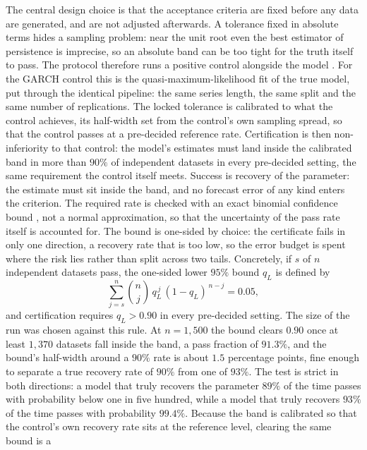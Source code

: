\documentclass[12pt,a4paper]{article}
\begin{document}
The central design choice is that the acceptance criteria are fixed
before any data are generated, and are not adjusted afterwards. A tolerance fixed in absolute terms hides a
sampling problem: near the unit root even the best estimator of
persistence is imprecise, so an absolute band can be too tight for the
truth itself to pass. The protocol therefore runs a positive control
alongside the model \citep{boger2026}. For the GARCH control this is
the quasi-maximum-likelihood fit of the true model, put through the
identical pipeline: the same series length, the same split and the same
number of replications. The locked tolerance is calibrated to what the
control achieves, its half-width set from the control's own sampling
spread, so that the control passes at a pre-decided reference rate.
Certification is then non-inferiority to that control: the model's
estimates must land inside the calibrated band in more than $90\%$ of
independent datasets in every pre-decided setting, the same requirement
the control itself meets. Success is recovery of the parameter: the
estimate must sit inside the band, and no forecast error of any kind
enters the criterion. The required rate is checked with an exact binomial
confidence bound \citep{clopperpearson1934}, not a normal approximation,
so that the uncertainty of the pass rate itself is accounted for. The
bound is one-sided by choice: the certificate fails in only one
direction, a recovery rate that is too low, so the error budget is
spent where the risk lies rather than split across two tails.
Concretely, if $s$ of $n$ independent datasets pass, the one-sided lower
$95\%$ bound $q_L$ is defined by
\begin{equation}
\sum_{j=s}^{n} \binom{n}{j}\, q_L^{\,j}\, (1-q_L)^{\,n-j} = 0.05,
\end{equation}
and certification requires $q_L > 0.90$ in every pre-decided setting.
The size of the run was chosen against this rule. At $n = 1{,}500$ the
bound clears $0.90$ once at least $1{,}370$ datasets fall inside the
band, a pass fraction of $91.3\%$, and the bound's half-width around a
$90\%$ rate is about $1.5$ percentage points, fine enough to separate a
true recovery rate of $90\%$ from one of $93\%$. The test is strict in
both directions: a model that truly recovers the parameter $89\%$ of the
time passes with probability below one in five hundred, while a model
that truly recovers $93\%$ of the time passes with probability $99.4\%$.
Because the band is calibrated so that the control's own recovery rate
sits at the reference level, clearing the same bound is a
\end{document}
